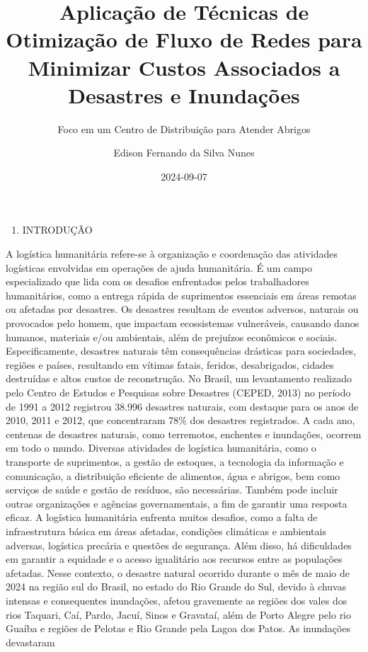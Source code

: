 \documentclass[
]{article}
\title{Aplicação de Técnicas de Otimização de Fluxo de Redes para
Minimizar Custos Associados a Desastres e Inundações}
\subtitle{Foco em um Centro de Distribuição para Atender Abrigos}
\author{Edison Fernando da Silva Nunes}
\date{2024-09-07}
\providecommand{\tightlist}{%
  \setlength{\itemsep}{0pt}\setlength{\parskip}{0pt}}
\begin{document}
\maketitle

\begin{enumerate}
\def\labelenumi{\arabic{enumi}.}
\tightlist
\item
  INTRODUÇÃO
\end{enumerate}

A logística humanitária refere-se à organização e coordenação das
atividades logísticas envolvidas em operações de ajuda humanitária. É um
campo especializado que lida com os desafios enfrentados pelos
trabalhadores humanitários, como a entrega rápida de suprimentos
essenciais em áreas remotas ou afetadas por desastres. Os desastres
resultam de eventos adversos, naturais ou provocados pelo homem, que
impactam ecossistemas vulneráveis, causando danos humanos, materiais
e/ou ambientais, além de prejuízos econômicos e sociais.
Especificamente, desastres naturais têm consequências drásticas para
sociedades, regiões e países, resultando em vítimas fatais, feridos,
desabrigados, cidades destruídas e altos custos de reconstrução. No
Brasil, um levantamento realizado pelo Centro de Estudos e Pesquisas
sobre Desastres (CEPED, 2013) no período de 1991 a 2012 registrou 38.996
desastres naturais, com destaque para os anos de 2010, 2011 e 2012, que
concentraram 78\% dos desastres registrados. A cada ano, centenas de
desastres naturais, como terremotos, enchentes e inundações, ocorrem em
todo o mundo. Diversas atividades de logística humanitária, como o
transporte de suprimentos, a gestão de estoques, a tecnologia da
informação e comunicação, a distribuição eficiente de alimentos, água e
abrigos, bem como serviços de saúde e gestão de resíduos, são
necessárias. Também pode incluir outras organizações e agências
governamentais, a fim de garantir uma resposta eficaz. A logística
humanitária enfrenta muitos desafios, como a falta de infraestrutura
básica em áreas afetadas, condições climáticas e ambientais adversas,
logística precária e questões de segurança. Além disso, há dificuldades
em garantir a equidade e o acesso igualitário aos recursos entre as
populações afetadas. Nesse contexto, o desastre natural ocorrido durante
o mês de maio de 2024 na região sul do Brasil, no estado do Rio Grande
do Sul, devido à chuvas intensas e consequentes inundações, afetou
gravemente as regiões dos vales dos rios Taquari, Caí, Pardo, Jacuí,
Sinos e Gravataí, além de Porto Alegre pelo rio Guaíba e regiões de
Pelotas e Rio Grande pela Lagoa dos Patos. As inundações devastaram
\end{document}
